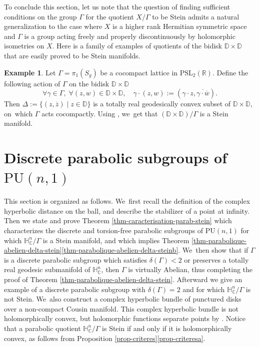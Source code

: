 \documentclass[JEP,XML,SOM,Unicode,NoEqCountersInSection,published]{cedram}
\theoremstyle{definition}
\newtheorem*{example}{Example}
\newcommand{\C}{\mathbb{C}}
\newcommand{\R}{\mathbb{R}}
\newcommand{\HNC}{\mathbb{H}^{n}_{\C}}
\newcommand{\PU}{\mathrm{PU}}
\def\C{\mathbb{C}}
\newcommand{\HNC}{\mathbb{H}^{n}_{\C}}
\newcommand{\PU}{\mathrm{PU}}
\begin{document}
To conclude this section, let us note that the question of finding sufficient conditions on the group $\Gamma$ for the quotient $X/\Gamma$ to be Stein admits a natural generalization to the case where $X$ is a higher rank Hermitian symmetric space and $\Gamma$ is a group acting freely and properly discontinuously by holomorphic isometries on $X$. Here is a family of examples of quotients of the bidisk $\mathbb{D}\times \mathbb{D}$ that are easily proved to be Stein manifolds.

\begin{example}
Let $\Gamma=\pi_1(S_g)$ be a cocompact lattice in $\mathrm{PSL}_2(\R)$. Define the following action of $\Gamma$ on the bidisk $\mathbb{D}\times \mathbb{D}$
\begin{equation*}
\forall \gamma \in \Gamma,\; \forall (z,w)\in \mathbb{D}\times \mathbb{D},\quad \gamma\cdot (z,w):= (\gamma \cdot z,\overline{\gamma \cdot \overline{w}}).
\end{equation*}
Then $\Delta:= \{(z,\overline{z}) \mid z\in \mathbb{D}\}$ is a totally real geodesically convex subset of $\mathbb{D}\times \mathbb{D}$, on~which $\Gamma$ acts cocompactly. Using \cite[Prop.\,3.2]{chenDiscreteGroupsHolomorphic2013}, we~get that $(\mathbb{D}\times \mathbb{D})/\Gamma$ is a Stein manifold.
\end{example}

\section{Discrete parabolic subgroups of \texorpdfstring{$\PU(n,1)$}{PU}}\label{section-paraboliques}

This section is organized as follows. We~first recall the definition of the complex hyperbolic distance on the ball, and describe the stabilizer of a point at infinity. Then we state and prove Theorem \ref{thm-caracterisation-parab-stein} which characterizes the discrete and torsion-free parabolic subgroups of $\PU(n,1)$ for which $\HNC/\Gamma$ is a Stein manifold, and which implies Theorem \ref{thm-parabolique-abelien-delta-stein}\eqref{thm-parabolique-abelien-delta-steinb}. We~then show that if $\Gamma$ is a discrete parabolic subgroup which satisfies $\delta(\Gamma)<2$ or preserves a totally real geodesic submanifold of $\HNC$, then $\Gamma$ is virtually Abelian, thus completing the proof of Theorem \ref{thm-parabolique-abelien-delta-stein}. Afterward we give an example of a discrete parabolic subgroup with $\delta(\Gamma)=2$ and for which $\HNC/\Gamma$ is not Stein. We~also construct a complex hyperbolic bundle of punctured disks over a non-compact Cousin manifold. This complex hyperbolic bundle is not holomorphically convex, but holomorphic functions separate points by \cite[Th.\,1.1]{miebachQuotientsBoundedHomogeneous2024}. Notice that a parabolic quotient $\HNC/\Gamma$ is Stein if and only if it is holomorphically convex, as follows from Proposition \ref{prop-criteres}\eqref{prop-criteresa}.
\end{document}
